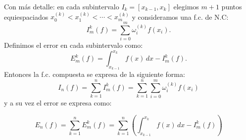 Con más detalle: en cada subintervalo $I_k=[x_{k-1},x_k]$ elegimos $m+1$
puntos equiespaciados $x_0^{(k)}<x_1^{(k)}<\cdots<x_m^{(k)}$ y
consideramos una f.c. de N.C:
\begin{equation*}
  I_m^k(f)=\sum_{i=0}^m \omega_i^{(k)}f(x_i).
\end{equation*}
Definimos el error en cada subintervalo como:
\begin{equation*}
  E_m^k(f)=\int_{x_{k-1}}^{x_k} f(x)\,dx -  I_m^k(f).
\end{equation*}
Entonces la f.c. compuesta se expresa de la siguiente forma:
\begin{equation*}
  I_n(f)=\sum_{k=1}^n I_m^k(f)  =\sum_{k=1}^n \sum_{i=0}^m \omega_i^{(k)}f(x_i)
\end{equation*}
y a su vez el error se expresa como:

\begin{equation*}
  E_n(f)=\sum_{k=1}^n E_m^k(f)  =\sum_{k=1}^n\left(
    \int_{x_{k-1}}^{x_k} f(x)\,dx -  I_m^k(f) \right)
\end{equation*}

